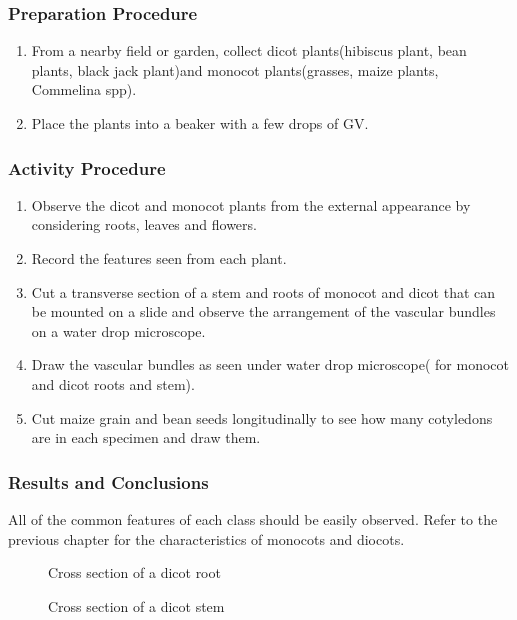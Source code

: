 \subsubsection*{Preparation Procedure}
\begin{enumerate}
\item{From a nearby field or garden, collect dicot plants(hibiscus plant, bean plants, black jack plant)and monocot plants(grasses, maize plants, Commelina spp).}
\item{Place the plants into a beaker with a few drops of GV.}
\end{enumerate}

\subsubsection*{Activity Procedure}
\begin{enumerate}
\item{Observe the dicot and monocot plants from the external appearance by considering roots, leaves and flowers.}
\item{Record the features seen from each plant.}
\item{Cut a transverse section of a stem and roots of monocot and dicot that can be mounted on a slide and observe the arrangement of the vascular bundles on a water drop microscope.}
\item{Draw the vascular bundles as seen under water drop microscope( for monocot and dicot roots and stem).}
\item{Cut maize grain and bean seeds longitudinally to see how many cotyledons are in each specimen and draw them.}
\end{enumerate}

\subsubsection*{Results and Conclusions}
All of the common features of each class should be easily observed. Refer to the previous chapter for the characteristics of monocots and diocots.
\begin{figure}[h]
\begin{center}
\def\svgwidth{6cm}

\caption{Cross section of a dicot root}
\label{fig:diroot}
\end{center}
\end{figure}

\begin{figure}[h]
\begin{center}
\def\svgwidth{6cm}

\caption{Cross section of a dicot stem}
\label{fig:fish}
\end{center}
\end{figure}

